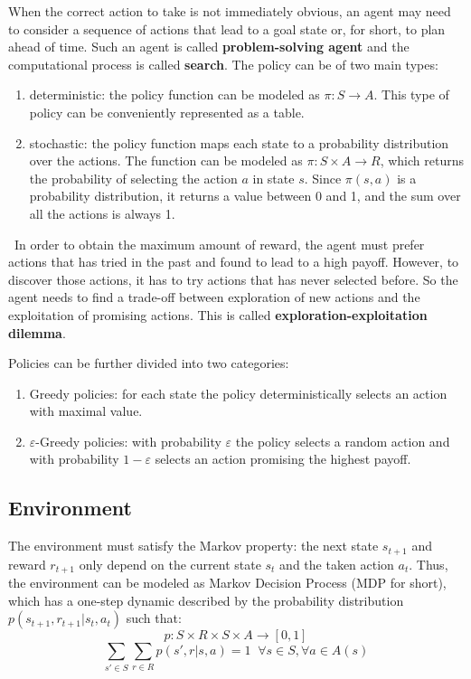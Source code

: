 \documentclass{article}
\begin{document}
When the correct action to take is not immediately obvious, an agent may need to consider a sequence of actions that lead to a goal state or, for short, to plan ahead of time. Such an agent is called \textbf{problem-solving agent} and the computational process is called \textbf{search}. The policy can be of two main types:
\begin{enumerate}
    \item deterministic: the policy function can be modeled as $\pi: S \to A$. This type of policy can be conveniently represented as a table.
    \item stochastic: the policy function maps each state to a probability distribution over the actions. The function can be modeled as $\pi: S\times A\to R$, which returns the probability of selecting the action $a$ in state $s$. Since $\pi(s, a)$ is a probability distribution, it returns a value between 0 and 1, and the sum over all the actions is always 1.
\end{enumerate}

\
In order to obtain the maximum amount of reward, the agent must prefer actions that has tried in the past and found to lead to a high payoff. However, to discover those actions, it has to try actions that has never selected before. So the agent needs to find a trade-off between exploration of new actions and the exploitation of promising actions. This is called \textbf{exploration-exploitation dilemma}. 

Policies can be further divided into two categories:
\begin{enumerate}
    \item Greedy policies: for each state the policy deterministically selects an action with maximal value.
    \item $\varepsilon$-Greedy policies: with probability $\varepsilon$ the policy selects a random action and with probability $1-\varepsilon$ selects an action promising the highest payoff.
\end{enumerate}

\subsection{Environment}
The environment must satisfy the Markov property: the next state $s_{t+1}$ and reward $r_{t+1}$ only depend on the current state $s_t$ and the taken action $a_t$. Thus, the environment can be modeled as Markov Decision Process (MDP for short), which has a one-step dynamic described by the probability distribution $p(s_{t+1}, r_{t+1}|s_t, a_t)$ such that:
\[p:S \times R \times S \times A \to [0, 1]\]
\[\sum_{s'\in S}\sum_{r\in R} p(s', r| s, a) = 1 \;\; \forall s \in S, \forall a \in A(s)\]
\end{document}
